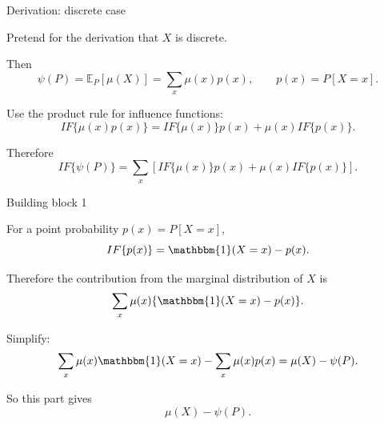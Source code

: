 \documentclass[xcolor={table}, handout]{beamer}
\begin{document}
\note{
\scriptsize \singlespacing

}
\begin{frame}{Derivation: discrete case}

\begin{wideitemize}
\item Pretend for the derivation that $X$ is discrete.\pause
\item Then
\[
\psi(P)
  =
  \mathbb{E}_P[\mu(X)]
  =
  \sum_x \mu(x)p(x),
\qquad
p(x)=P[X=x].
\]\pause
\item Use the product rule for influence functions:
\[
IF\{\mu(x)p(x)\}
  =
  IF\{\mu(x)\}p(x)
  +
  \mu(x)IF\{p(x)\}.
\]\pause
\item Therefore
\[
IF\{\psi(P)\}
  =
  \sum_x
  \left[
    IF\{\mu(x)\}p(x)
    +
    \mu(x)IF\{p(x)\}
  \right].
\]
\end{wideitemize}

\end{frame}

\note{
\scriptsize \singlespacing

}
\begin{frame}{Building block 1}

\small

\begin{wideitemize}
\item For a point probability $p(x)=P[X=x]$,
\[
IF\{p(x)\}
  =
  \mathbbm{1}(X=x)-p(x).
\]\pause
\item Therefore the contribution from the marginal distribution of $X$ is
\[
\sum_x \mu(x)\{\mathbbm{1}(X=x)-p(x)\}.
\]\pause
\item Simplify:
\[
\sum_x \mu(x)\mathbbm{1}(X=x)
-
\sum_x \mu(x)p(x)
  =
  \mu(X)-\psi(P).
\]\pause
\item So this part gives
\[
\boxed{\mu(X)-\psi(P)}.
\]
\end{wideitemize}

\end{frame}
\end{document}
